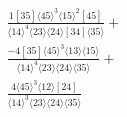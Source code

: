 \documentclass[varwidth, border=5pt]{standalone}
\begin{document}
\begin{my}
$\begin{gathered}
\scriptscriptstyle\frac{1[35]⟨45⟩^3⟨15⟩^2[45]}{⟨14⟩^4⟨23⟩⟨24⟩[34]⟨35⟩}+\\
\scriptscriptstyle\frac{-4[35]⟨45⟩^3⟨13⟩⟨15⟩}{⟨14⟩^4⟨23⟩⟨24⟩⟨35⟩}+\\
\scriptscriptstyle\frac{4⟨45⟩^3⟨12⟩[24]}{⟨14⟩^3⟨23⟩⟨24⟩⟨35⟩}\phantom{+}
\end{gathered}$
\end{my}
\end{document}
